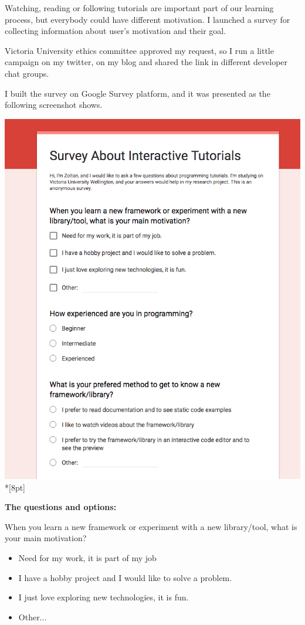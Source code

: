 \documentclass[12pt, a4paper, oneside, openright, medskipamount]{report}
\begin{document}
Watching, reading or following tutorials are important part of our learning process, but everybody could have different motivation. I launched a survey for collecting information about user's motivation and their goal.

Victoria University ethics committee approved my request, so I run a little campaign on my twitter, on my blog and shared the link in different developer chat groups.

I built the survey on Google Survey platform, and it was presented as the following screenshot shows.

\includegraphics[width=1\textwidth]{assets/survey-screenshot.png}\\*[8pt]

\textbf{The questions and options:}

\noindent When you learn a new framework or experiment with a new library/tool, what is your main motivation?
\begin{itemize}[noitemsep]
\item Need for my work, it is part of my job
\item I have a hobby project and I would like to solve a problem.
\item I just love exploring new technologies, it is fun.
\item Other...
\end{itemize}
\end{document}
